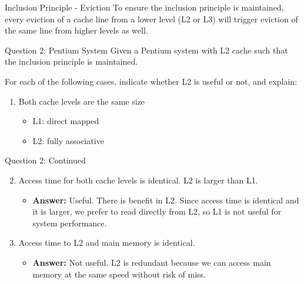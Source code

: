 \documentclass[aspectratio=169,12pt]{beamer}
\begin{document}
\begin{frame}{Inclusion Principle - Eviction}
To ensure the inclusion principle is maintained, every eviction of a cache line from a lower level (L2 or L3) will trigger eviction of the same line from higher levels as well.

\begin{center}
\end{center}
\end{frame}

\begin{frame}{Question 2: Pentium System}
Given a Pentium system with L2 cache such that the inclusion principle is maintained.

For each of the following cases, indicate whether L2 is useful or not, and explain:

\begin{enumerate}
    \item Both cache levels are the same size
    \begin{itemize}
        \item L1: direct mapped
        \item L2: fully associative
    \end{itemize}
\end{enumerate}
\end{frame}

\begin{frame}{Question 2: Continued}
\begin{enumerate}
    \setcounter{enumi}{1}
    \item Access time for both cache levels is identical. L2 is larger than L1.
    \begin{itemize}
        \item \textbf{Answer:} Useful. There is benefit in L2. Since access time is identical and it is larger, we prefer to read directly from L2, so L1 is not useful for system performance.
    \end{itemize}
    
    \item Access time to L2 and main memory is identical.
    \begin{itemize}
        \item \textbf{Answer:} Not useful. L2 is redundant because we can access main memory at the same speed without risk of miss.
    \end{itemize}
\end{enumerate}
\end{frame}
\end{document}
